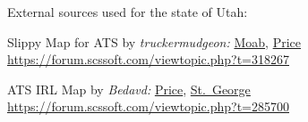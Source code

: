












\vspace{2em}\footnoterule
{\footnotesize \noindent External sources used for the state of Utah:
\begin{description}[
	style=nextline,
	leftmargin=1.1em,
	labelsep=0pt,
	parsep=0pt,
	font=\normalfont,
]

\item[$\ast$]
Slippy Map for ATS by \textit{truckermudgeon:}
\hyperref[city:Moab]{Moab},
\hyperref[city:Price]{Price}
\url{https://forum.scssoft.com/viewtopic.php?t=318267}

\item[$\dagger$]
ATS IRL Map by \textit{Bedavd:}
\hyperref[city:Price]{Price},
\hyperref[city:st_george]{St.\ George}
\url{https://forum.scssoft.com/viewtopic.php?t=285700}

\end{description}
}
